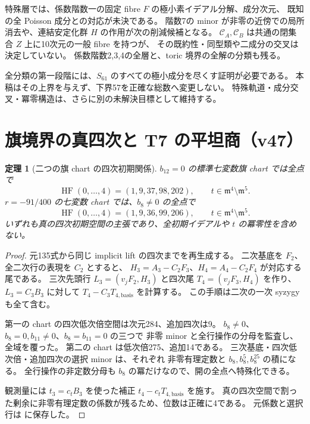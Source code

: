 \documentclass[11pt,a4paper]{ltjsarticle}
\newtheorem{theorem}{定理}[section]
\theoremstyle{remark}
\begin{document}
特殊層では、係数階数一の固定 fibre $F$ の極小素イデアル分解、成分次元、
既知の全 Poisson 成分との対応が未決である。
階数7の minor が非零の近傍での局所消去や、連結安定化群 $H$ の作用が次の削減候補となる。
$\mathcal C_A,\mathcal C_B$ は共通の閉集合 $Z$ 上に10次元の一般 fibre を持つが、
その既約性・同型類や二成分の交叉は決定していない。
係数階数2,3,4の全層と、toric 境界の全解の分類も残る。

全分類の第一段階には、$S_{61}$ のすべての極小成分を尽くす証明が必要である。
本稿はその上界を与えず、下界57を正確な総数へ変更しない。
特殊軌道・成分交叉・冪零構造は、さらに別の未解決目標として維持する。

\section{旗境界の真四次と T7 の平坦商（v47）}

\begin{theorem}[二つの旗 chart の四次初期関係]
$b_{12}=0$ の標準七変数旗 chart では全点で
\[
 \operatorname{HF}(0,\ldots,4)=(1,9,37,98,202),\qquad
 t\in\mathfrak m^4\setminus\mathfrak m^5.
\]
$r=-91/400$ の七変数 chart では、$b_8\ne0$ の全点で
\[
 \operatorname{HF}(0,\ldots,4)=(1,9,36,99,206),\qquad
 t\in\mathfrak m^4\setminus\mathfrak m^5.
\]
いずれも真の四次初期空間の主張であり、全初期イデアルや $t$ の冪零性を含めない。
\end{theorem}

\begin{proof}
元135式から同じ implicit lift の四次までを再生成する。
二次基底を $F_2$、全二次行の表現を $C_2$ とすると、
$H_3=A_3-C_2F_3$、$H_4=A_4-C_2F_4$ が対応する尾である。
三次先頭行 $L_3=(v_jF_2,H_3)$ と四次尾 $T_4=(v_jF_3,H_4)$ を作り、
$L_3=C_3B_3$ に対して $T_4-C_3T_{4,\mathrm{basis}}$ を計算する。
この手順は二次の一次 syzygy も全て含む。

第一の chart の四次低次倍空間は次元284、追加四次は9。
$b_8\ne0$、$b_8=0,b_{11}\ne0$、$b_8=b_{11}=0$ の三つで
非零 minor と全行操作の分母を監査し、全域を覆った。
第二の chart は低次倍275、追加14である。
三次基底・四次低次倍・追加四次の選択 minor は、それぞれ
非零有理定数と $b_8,b_8^5,b_8^{25}$ の積になる。
全行操作の非定数分母も $b_8$ の冪だけなので、開の全点へ特殊化できる。

観測量には $t_3=c_tB_3$ を使った補正 $t_4-c_tT_{4,\mathrm{basis}}$ を施す。
真の四次空間で割った剰余に非零有理定数の係数が残るため、位数は正確に4である。
元係数と選択行は \cite{flag-zero12-four-v47,flag-socle-four-v47} に保存した。
\end{proof}
\end{document}
